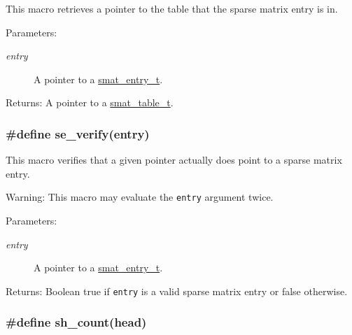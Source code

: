 This macro retrieves a pointer to the table that the sparse matrix entry is in.

\begin{Desc}
\item[Parameters:]
\begin{description}
\item[{\em entry}]A pointer to a \hyperlink{group__dbprim__smat_a2}{smat\_\-entry\_\-t}.\end{description}
\end{Desc}
\begin{Desc}
\item[Returns:]A pointer to a \hyperlink{group__dbprim__smat_a0}{smat\_\-table\_\-t}. \end{Desc}
\hypertarget{group__dbprim__smat_a38}{
\subsubsection[se\_\-verify]{\setlength{\rightskip}{0pt plus 5cm}\#define se\_\-verify(entry)}}
\label{group__dbprim__smat_a38}


This macro verifies that a given pointer actually does point to a sparse matrix entry.

\begin{Desc}
\item[Warning:]This macro may evaluate the {\tt entry} argument twice.\end{Desc}
\begin{Desc}
\item[Parameters:]
\begin{description}
\item[{\em entry}]A pointer to a \hyperlink{group__dbprim__smat_a2}{smat\_\-entry\_\-t}.\end{description}
\end{Desc}
\begin{Desc}
\item[Returns:]Boolean true if {\tt entry} is a valid sparse matrix entry or false otherwise. \end{Desc}
\hypertarget{group__dbprim__smat_a33}{
\subsubsection[sh\_\-count]{\setlength{\rightskip}{0pt plus 5cm}\#define sh\_\-count(head)}}
\label{group__dbprim__smat_a33}


